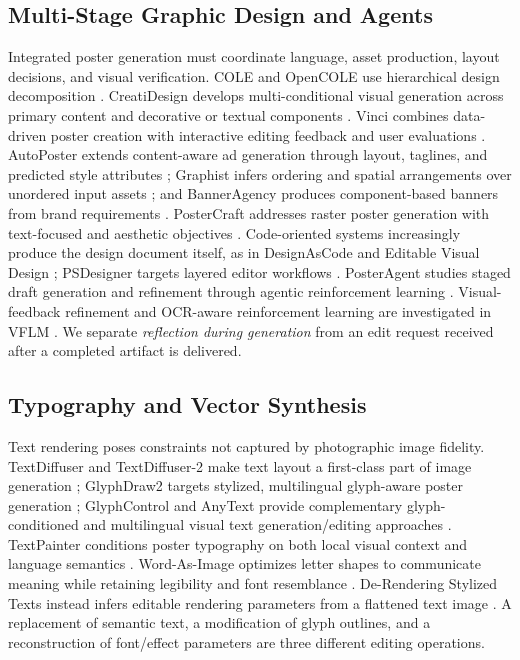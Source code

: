 \subsection{Multi-Stage Graphic Design and Agents}
Integrated poster generation must coordinate language, asset production, layout decisions, and visual verification. COLE and OpenCOLE use hierarchical design decomposition \citep{cole2023,opencole2024}. CreatiDesign develops multi-conditional visual generation across primary content and decorative or textual components \citep{creatidesign2026}. Vinci combines data-driven poster creation with interactive editing feedback and user evaluations \citep{vinci2021}. AutoPoster extends content-aware ad generation through layout, taglines, and predicted style attributes \citep{autoposter2023}; Graphist infers ordering and spatial arrangements over unordered input assets \citep{graphist2025}; and BannerAgency produces component-based banners from brand requirements \citep{banneragency2025}. PosterCraft addresses raster poster generation with text-focused and aesthetic objectives \citep{postercraft2026}. Code-oriented systems increasingly produce the design document itself, as in DesignAsCode and Editable Visual Design \citep{designascode2026,editablevisual2026}; PSDesigner targets layered editor workflows \citep{psdesigner2026}. PosterAgent studies staged draft generation and refinement through agentic reinforcement learning \citep{posteragent2026}. Visual-feedback refinement and OCR-aware reinforcement learning are investigated in VFLM \citep{guo2026visualfeedback}. We separate \emph{reflection during generation} from an edit request received after a completed artifact is delivered.

\subsection{Typography and Vector Synthesis}
Text rendering poses constraints not captured by photographic image fidelity. TextDiffuser and TextDiffuser-2 make text layout a first-class part of image generation \citep{textdiffuser2023,textdiffuser22024}; GlyphDraw2 targets stylized, multilingual glyph-aware poster generation \citep{glyphdraw2025}; GlyphControl and AnyText provide complementary glyph-conditioned and multilingual visual text generation/editing approaches \citep{glyphcontrol2023,anytext2024}. TextPainter conditions poster typography on both local visual context and language semantics \citep{textpainter2023}. Word-As-Image optimizes letter shapes to communicate meaning while retaining legibility and font resemblance \citep{wordasimage2023}. De-Rendering Stylized Texts instead infers editable rendering parameters from a flattened text image \citep{derendering2021}. A replacement of semantic text, a modification of glyph outlines, and a reconstruction of font/effect parameters are three different editing operations.


